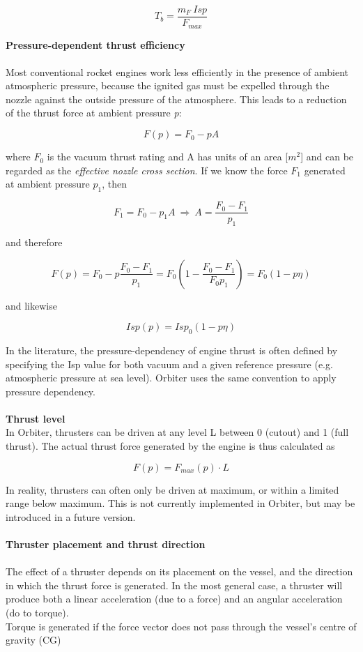 \documentclass[Orbiter Developer Manual.tex]{subfiles}
\begin{document}
\[ T_{b} = \frac{m_{F} \ Isp}{F_{max}} \]

\noindent
\textbf{Pressure-dependent thrust efficiency}\\
\\
Most conventional rocket engines work less efficiently in the presence of ambient atmospheric pressure, because the ignited gas must be expelled through the nozzle against the outside pressure of the atmosphere. This leads to a reduction of the thrust force at ambient pressure \textit{p}:

\[ F(p) = F_{0} - p A \]

\noindent
where $F_{0}$ is the vacuum thrust rating and A has units of an area [$m^{2}$] and can be regarded as the \textit{effective nozzle cross section}. If we know the force $F_{1}$ generated at ambient pressure $p_{1}$, then

\[ F_{1} = F_{0} - p_{1}A \ \Rightarrow \ A = \frac{F_{0} - F_{1}}{p_{1}} \]

\noindent
and therefore

\[ F(p) = F_{0} - p\frac{F_{0} - F_{1}}{p_{1}} = F_{0}(1 - \frac{F_{0} - F_{1}}{F_{0}p_{1}}) = F_{0}(1 - p\eta) \]

\noindent
and likewise

\[ Isp(p) = Isp_{0}(1 - p\eta) \]

\noindent
In the literature, the pressure-dependency of engine thrust is often defined by specifying the Isp value for both vacuum and a given reference pressure (e.g. atmospheric pressure at sea level). Orbiter uses the same convention to apply pressure dependency.\\
\\
\textbf{Thrust level}\\
In Orbiter, thrusters can be driven at any level L between 0 (cutout) and 1 (full thrust). The actual thrust force generated by the engine is thus calculated as

\[ F(p) = F_{max}(p) \cdot L \]

\noindent
In reality, thrusters can often only be driven at maximum, or within a limited range below maximum. This is not currently implemented in Orbiter, but may be introduced in a future version.\\
\\
\textbf{Thruster placement and thrust direction}\\
\\
The effect of a thruster depends on its placement on the vessel, and the direction in which the thrust force is generated. In the most general case, a thruster will produce both a linear acceleration (due to a force) and an angular acceleration (do to torque).\\
Torque is generated if the force vector does not pass through the vessel’s centre of gravity (CG)
\end{document}
